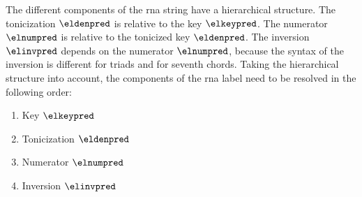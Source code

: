 
The different components of the \gls{rna} string have a
hierarchical structure. The tonicization $\eldenpred$ is
relative to the key $\elkeypred$. The numerator $\elnumpred$
is relative to the tonicized key $\eldenpred$. The inversion
$\elinvpred$ depends on the numerator $\elnumpred$, because
the syntax of the inversion is different for triads and for
seventh chords. Taking the hierarchical structure into
account, the components of the \gls{rna} label need to be
resolved in the following order:

\begin{enumerate} 
    \item Key $\elkeypred$ 
    \item Tonicization $\eldenpred$ 
    \item Numerator $\elnumpred$ 
    \item Inversion $\elinvpred$ 
\end{enumerate}
